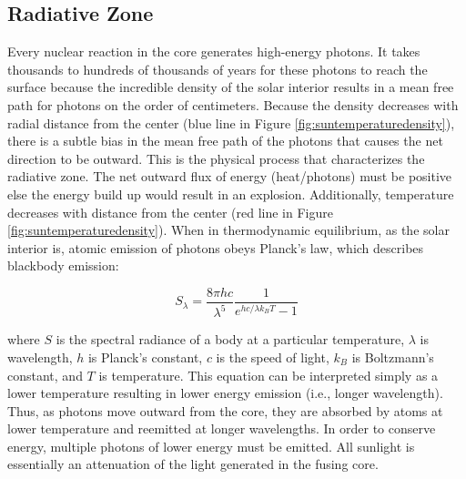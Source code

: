 \subsection{Radiative Zone}
Every nuclear reaction in the core generates high-energy photons. It takes thousands to hundreds of thousands of years for these photons to reach the surface because the incredible density of the solar interior results in a mean free path for photons on the order of centimeters. Because the density decreases with radial distance from the center (blue line in Figure \ref{fig:suntemperaturedensity}), there is a subtle bias in the mean free path of the photons that causes the net direction to be outward. This is the physical process that characterizes the radiative zone. The net outward flux of energy (heat/photons) must be positive else the energy build up would result in an explosion. Additionally, temperature decreases with distance from the center (red line in Figure \ref{fig:suntemperaturedensity}). When in thermodynamic equilibrium, as the solar interior is, atomic emission of photons obeys Planck's law, which describes blackbody emission: 

\begin{equation}
    \label{eq:planck}
    S_\lambda = \frac{8\pi hc}{\lambda^5}\frac{1}{e^{hc/\lambda k_BT} - 1}
\end{equation}

\noindent where $S$ is the spectral radiance of a body at a particular temperature, $\lambda$ is wavelength, $h$ is Planck's constant, $c$ is the speed of light, $k_B$ is Boltzmann's constant, and $T$ is temperature. This equation can be interpreted simply as a lower temperature resulting in lower energy emission (i.e., longer wavelength). Thus, as photons move outward from the core, they are absorbed by atoms at lower temperature and reemitted at longer wavelengths. In order to conserve energy, multiple photons of lower energy must be emitted. All sunlight is essentially an attenuation of the light generated in the fusing core. 

